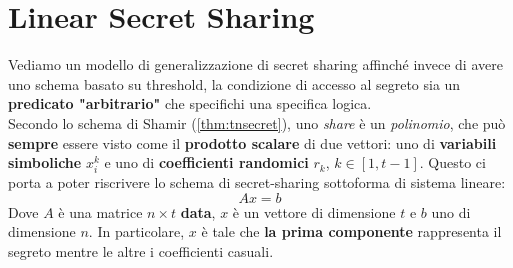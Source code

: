 \chapter{Linear Secret Sharing}
Vediamo un modello di generalizzazione di secret sharing affinché invece di avere uno schema basato su threshold, la condizione di accesso al segreto sia un \textbf{predicato "arbitrario"} che specifichi una specifica logica.\\
Secondo lo schema di Shamir (\cref{thm:tnsecret}), uno \textit{share} è un \textit{polinomio}, che può \textbf{sempre} essere visto come il \textbf{prodotto scalare} di due vettori: uno di \textbf{variabili simboliche} $x_i^{k}$ e uno di \textbf{coefficienti randomici} $r_k$, $k\in[1,t-1]$. Questo ci porta a poter riscrivere lo schema di secret-sharing sottoforma di sistema lineare: 
\[Ax=b\]
Dove $A$ è una matrice $n\times t$ \textbf{data}, $x$ è un vettore di dimensione $t$ e $b$ uno di dimensione $n$. In particolare, $x$ è tale che \textbf{la prima componente} rappresenta il segreto mentre le altre i coefficienti casuali. 
